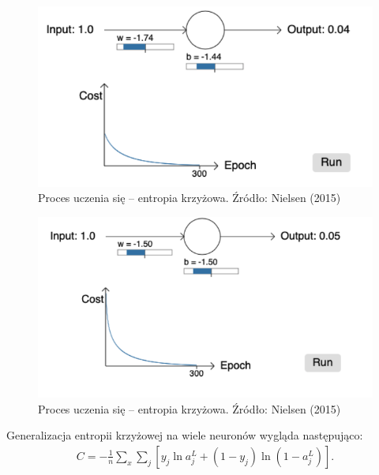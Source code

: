 \documentclass[10pt, oneside]{article}
\theoremstyle{remark}
\begin{document}
\begin{figure}[!htpb]
	\centering
	\includegraphics[width=.5\linewidth]{figures/learn_ce_0609}
	\caption{Proces uczenia się -- entropia krzyżowa. Źródło: Nielsen (2015)}
\end{figure}
\begin{figure}[!htpb]
	\centering
	\includegraphics[width=.5\linewidth]{figures/learn_ce_2020}
	\caption{Proces uczenia się -- entropia krzyżowa. Źródło: Nielsen (2015)}
\end{figure}
Generalizacja entropii krzyżowej na wiele neuronów wygląda następująco:
\begin{eqnarray}  C = -\frac{1}{n} \sum_x
  \sum_j \left[y_j \ln a^L_j + (1-y_j) \ln (1-a^L_j) \right].
\end{eqnarray}

%
%
%
%
\end{document}
